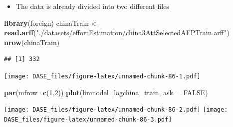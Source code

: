 \documentclass[]{book}
\newenvironment{Shaded}{\begin{snugshade}}{\end{snugshade}}
\newcommand{\KeywordTok}[1]{\textcolor[rgb]{0.13,0.29,0.53}{\textbf{{#1}}}}
\newcommand{\DataTypeTok}[1]{\textcolor[rgb]{0.13,0.29,0.53}{{#1}}}
\newcommand{\DecValTok}[1]{\textcolor[rgb]{0.00,0.00,0.81}{{#1}}}
\newcommand{\StringTok}[1]{\textcolor[rgb]{0.31,0.60,0.02}{{#1}}}
\newcommand{\OtherTok}[1]{\textcolor[rgb]{0.56,0.35,0.01}{{#1}}}
\newcommand{\NormalTok}[1]{{#1}}
\providecommand{\tightlist}{%
  \setlength{\itemsep}{0pt}\setlength{\parskip}{0pt}}
\begin{document}
\begin{itemize}
\tightlist
\item
  The data is already divided into two different files
\end{itemize}

\begin{Shaded}
\begin{Highlighting}[]
\KeywordTok{library}\NormalTok{(foreign)}
\NormalTok{chinaTrain <-}\StringTok{ }\KeywordTok{read.arff}\NormalTok{(}\StringTok{"./datasets/effortEstimation/china3AttSelectedAFPTrain.arff"}\NormalTok{)}
\KeywordTok{nrow}\NormalTok{(chinaTrain)}
\end{Highlighting}
\end{Shaded}

\begin{verbatim}
## [1] 332
\end{verbatim}

\begin{Shaded}
\end{Shaded}

\texttt{[image: DASE\_files/figure-latex/unnamed-chunk-86-1.pdf]}

\begin{Shaded}
\begin{Highlighting}[]
\KeywordTok{par}\NormalTok{(}\DataTypeTok{mfrow=}\KeywordTok{c}\NormalTok{(}\DecValTok{1}\NormalTok{,}\DecValTok{2}\NormalTok{))}
\KeywordTok{plot}\NormalTok{(linmodel_logchina_train, }\DataTypeTok{ask =} \OtherTok{FALSE}\NormalTok{)}
\end{Highlighting}
\end{Shaded}

\texttt{[image: DASE\_files/figure-latex/unnamed-chunk-86-2.pdf]}
\texttt{[image: DASE\_files/figure-latex/unnamed-chunk-86-3.pdf]}
\end{document}

